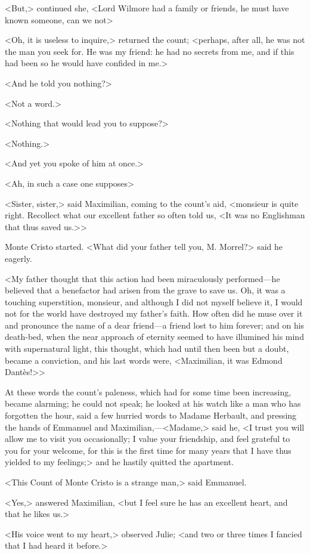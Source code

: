  <But,> continued she, <Lord Wilmore had a family or friends, he must have known someone, can we not\longdash> 

 <Oh, it is useless to inquire,> returned the count; <perhaps, after all, he was not the man you seek for. He was my friend: he had no secrets from me, and if this had been so he would have confided in me.> 

 <And he told you nothing?> 

 <Not a word.> 

 <Nothing that would lead you to suppose?> 

 <Nothing.> 

 <And yet you spoke of him at once.> 

 <Ah, in such a case one supposes\longdash> 

 <Sister, sister,> said Maximilian, coming to the count's aid, <monsieur is quite right. Recollect what our excellent father so often told us, <It was no Englishman that thus saved us.>> 

 Monte Cristo started. <What did your father tell you, M. Morrel?> said he eagerly. 

 <My father thought that this action had been miraculously performed—he believed that a benefactor had arisen from the grave to save us. Oh, it was a touching superstition, monsieur, and although I did not myself believe it, I would not for the world have destroyed my father's faith. How often did he muse over it and pronounce the name of a dear friend—a friend lost to him forever; and on his death-bed, when the near approach of eternity seemed to have illumined his mind with supernatural light, this thought, which had until then been but a doubt, became a conviction, and his last words were, <Maximilian, it was Edmond Dantès!>> 

 At these words the count's paleness, which had for some time been increasing, became alarming; he could not speak; he looked at his watch like a man who has forgotten the hour, said a few hurried words to Madame Herbault, and pressing the hands of Emmanuel and Maximilian,—<Madame,> said he, <I trust you will allow me to visit you occasionally; I value your friendship, and feel grateful to you for your welcome, for this is the first time for many years that I have thus yielded to my feelings;> and he hastily quitted the apartment. 

 <This Count of Monte Cristo is a strange man,> said Emmanuel. 

 <Yes,> answered Maximilian, <but I feel sure he has an excellent heart, and that he likes us.> 

 <His voice went to my heart,> observed Julie; <and two or three times I fancied that I had heard it before.> 
